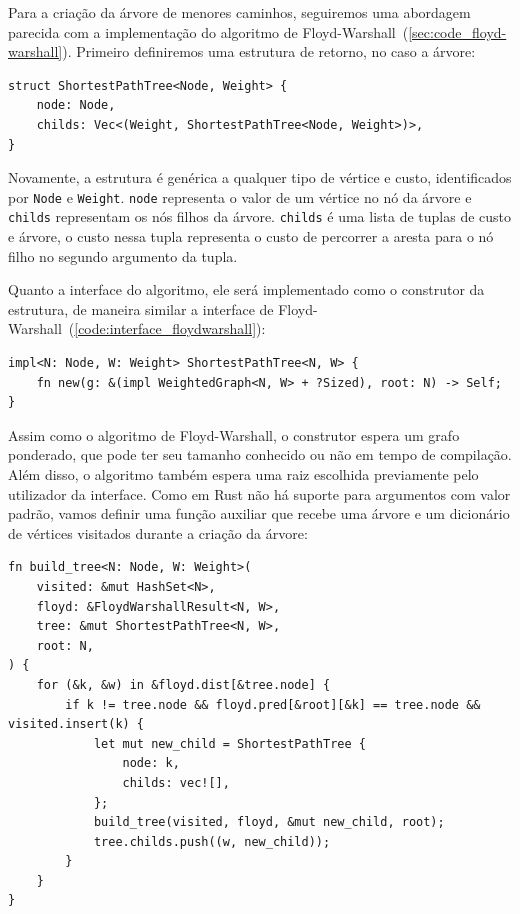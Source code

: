 Para a criação da árvore de menores caminhos, seguiremos uma
abordagem parecida com a implementação do algoritmo de
Floyd-Warshall~(\ref{sec:code_floyd-warshall}). Primeiro definiremos
uma estrutura de retorno, no caso a árvore:

\begin{listing}[H]
  \caption{Estrutura de retorno do algoritmo de criação da árvore de
  caminhos mais curtos}
  \begin{verbatim}
struct ShortestPathTree<Node, Weight> {
    node: Node,
    childs: Vec<(Weight, ShortestPathTree<Node, Weight>)>,
}
  \end{verbatim}
\end{listing}

Novamente, a estrutura é genérica a qualquer tipo de vértice e custo,
identificados por \texttt{Node} e \texttt{Weight}. \texttt{node}
representa o valor de um vértice no nó da árvore e \texttt{childs}
representam os nós filhos da árvore. \texttt{childs} é uma lista de
tuplas de custo e árvore, o custo nessa tupla representa o custo de
percorrer a aresta para o nó filho no segundo argumento da tupla.

Quanto a interface do algoritmo, ele será implementado como o
construtor da estrutura, de maneira similar a interface de
Floyd-Warshall~(\ref{code:interface_floydwarshall}):

\begin{listing}[H]
  \caption{Interface do algoritmo de criação da árvore de caminhos mais curtos}
  \begin{verbatim}
impl<N: Node, W: Weight> ShortestPathTree<N, W> {
    fn new(g: &(impl WeightedGraph<N, W> + ?Sized), root: N) -> Self;
}
  \end{verbatim}
	\end{listing}

Assim como o algoritmo de Floyd-Warshall, o construtor espera um
grafo ponderado, que pode ter seu tamanho conhecido ou não em tempo
de compilação. Além disso, o algoritmo também espera uma raiz
escolhida previamente pelo utilizador da interface. Como em Rust não
há suporte para argumentos com valor padrão, vamos definir uma função
auxiliar que recebe uma árvore e um dicionário de vértices visitados
durante a criação da árvore:

\begin{verbatim}
fn build_tree<N: Node, W: Weight>(
    visited: &mut HashSet<N>,
    floyd: &FloydWarshallResult<N, W>,
    tree: &mut ShortestPathTree<N, W>,
    root: N,
) {
    for (&k, &w) in &floyd.dist[&tree.node] {
        if k != tree.node && floyd.pred[&root][&k] == tree.node && visited.insert(k) {
            let mut new_child = ShortestPathTree {
                node: k,
                childs: vec![],
            };
            build_tree(visited, floyd, &mut new_child, root);
            tree.childs.push((w, new_child));
        }
    }
}
\end{verbatim}

